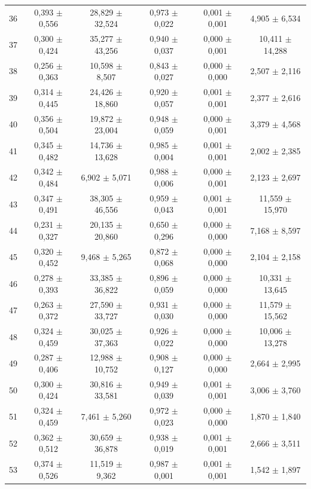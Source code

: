 \begin{tabular}{l c c c c c}
36 & 0,393 $\pm$ 0,556 & 28,829 $\pm$ 32,524 & 0,973 $\pm$ 0,022 & 0,001 $\pm$ 0,001 & 4,905 $\pm$ 6,534 \\
37 & 0,300 $\pm$ 0,424 & 35,277 $\pm$ 43,256 & 0,940 $\pm$ 0,037 & 0,000 $\pm$ 0,001 & 10,411 $\pm$ 14,288 \\
38 & 0,256 $\pm$ 0,363 & 10,598 $\pm$ 8,507 & 0,843 $\pm$ 0,027 & 0,000 $\pm$ 0,000 & 2,507 $\pm$ 2,116 \\
39 & 0,314 $\pm$ 0,445 & 24,426 $\pm$ 18,860 & 0,920 $\pm$ 0,057 & 0,001 $\pm$ 0,001 & 2,377 $\pm$ 2,616 \\
40 & 0,356 $\pm$ 0,504 & 19,872 $\pm$ 23,004 & 0,948 $\pm$ 0,059 & 0,000 $\pm$ 0,001 & 3,379 $\pm$ 4,568 \\
41 & 0,345 $\pm$ 0,482 & 14,736 $\pm$ 13,628 & 0,985 $\pm$ 0,004 & 0,001 $\pm$ 0,001 & 2,002 $\pm$ 2,385 \\
42 & 0,342 $\pm$ 0,484 & 6,902 $\pm$ 5,071 & 0,988 $\pm$ 0,006 & 0,000 $\pm$ 0,001 & 2,123 $\pm$ 2,697 \\
43 & 0,347 $\pm$ 0,491 & 38,305 $\pm$ 46,556 & 0,959 $\pm$ 0,043 & 0,001 $\pm$ 0,001 & 11,559 $\pm$ 15,970 \\
44 & 0,231 $\pm$ 0,327 & 20,135 $\pm$ 20,860 & 0,650 $\pm$ 0,296 & 0,000 $\pm$ 0,000 & 7,168 $\pm$ 8,597 \\
45 & 0,320 $\pm$ 0,452 & 9,468 $\pm$ 5,265 & 0,872 $\pm$ 0,068 & 0,000 $\pm$ 0,000 & 2,104 $\pm$ 2,158 \\
46 & 0,278 $\pm$ 0,393 & 33,385 $\pm$ 36,822 & 0,896 $\pm$ 0,059 & 0,000 $\pm$ 0,000 & 10,331 $\pm$ 13,645 \\
47 & 0,263 $\pm$ 0,372 & 27,590 $\pm$ 33,727 & 0,931 $\pm$ 0,030 & 0,000 $\pm$ 0,000 & 11,579 $\pm$ 15,562 \\
48 & 0,324 $\pm$ 0,459 & 30,025 $\pm$ 37,363 & 0,926 $\pm$ 0,022 & 0,000 $\pm$ 0,000 & 10,006 $\pm$ 13,278 \\
49 & 0,287 $\pm$ 0,406 & 12,988 $\pm$ 10,752 & 0,908 $\pm$ 0,127 & 0,000 $\pm$ 0,000 & 2,664 $\pm$ 2,995 \\
50 & 0,300 $\pm$ 0,424 & 30,816 $\pm$ 33,581 & 0,949 $\pm$ 0,039 & 0,001 $\pm$ 0,001 & 3,006 $\pm$ 3,760 \\
51 & 0,324 $\pm$ 0,459 & 7,461 $\pm$ 5,260 & 0,972 $\pm$ 0,023 & 0,000 $\pm$ 0,000 & 1,870 $\pm$ 1,840 \\
52 & 0,362 $\pm$ 0,512 & 30,659 $\pm$ 36,878 & 0,938 $\pm$ 0,019 & 0,001 $\pm$ 0,001 & 2,666 $\pm$ 3,511 \\
53 & 0,374 $\pm$ 0,526 & 11,519 $\pm$ 9,362 & 0,987 $\pm$ 0,001 & 0,001 $\pm$ 0,001 & 1,542 $\pm$ 1,897 \\

\end{tabular}
